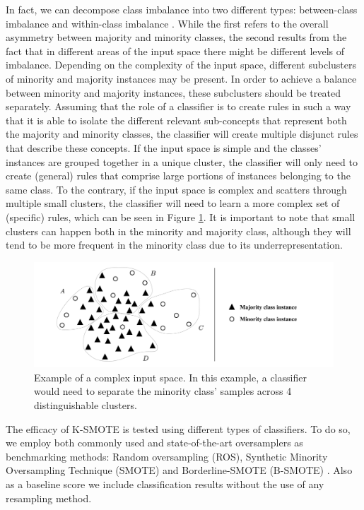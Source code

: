 \documentclass[parskip=full]{scrartcl}
\begin{document}
In fact, we can decompose class imbalance into two different types:
between-class imbalance and within-class imbalance \cite{Douzas2018, Jo2004}. While
the first refers to the overall asymmetry between majority and minority
classes, the second results from the fact that in different areas of the input
space there might be different levels of imbalance. Depending on the
complexity of the input space, different subclusters of minority and majority
instances may be present. In order to achieve a balance between minority and
majority instances, these subclusters should be treated separately. Assuming
that the role of a classifier is to create rules in such a way that it is able
to isolate the different relevant sub-concepts that represent both the
majority and minority classes, the classifier will create multiple disjunct
rules that describe these concepts. If the input space is simple and the
classes’ instances are grouped together in a unique cluster, the classifier
will only need to create (general) rules that comprise large portions of
instances belonging to the same class. To the contrary, if the input space is
complex and scatters through multiple small clusters, the classifier will need
to learn a more complex set of (specific) rules, which can be seen in Figure
\ref{fig:complex_input_space_example}. It is important to note that small
clusters can happen both in the minority and majority class, although they
will tend to be more frequent in the minority class due to its
underrepresentation.  

\begin{figure}[H]
	\centering
	\includegraphics[width=1\linewidth]{../analysis/complex_input_space_example}
	\caption{Example of a complex input space. In this example, a classifier
        would need to separate the minority class' samples across 4
        distinguishable clusters. }
	\label{fig:complex_input_space_example}
\end{figure}

The efficacy of K-SMOTE is tested using
different types of classifiers. To do so, we employ both commonly used and
state-of-the-art oversamplers as benchmarking methods: Random oversampling
(ROS), Synthetic Minority Oversampling Technique (SMOTE) \cite{Chawla2002} and
Borderline-SMOTE (B-SMOTE) \cite{Han2005}. Also as a baseline score we include
classification results without the use of any resampling method.
\end{document}

